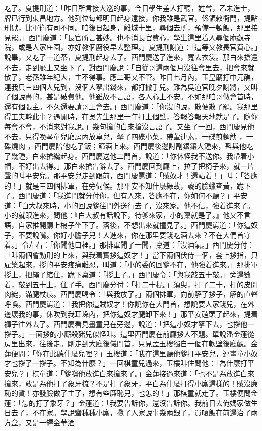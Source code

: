 吃了。夏提刑道：「昨日所言接大巡的事，今日學生差人打聽，姓曾，乙未進士，牌已行到東昌地方。他列位每都明日起身遠接，你我雖是武官，係領敕衙門，提點刑獄，比軍衛有司不同。咱後日起身，離城十里，尋個去所，預備一頓飯，那里接見罷。」西門慶道：「長官所言甚妙。也不消長官費心，學生這里着人尋個庵觀寺院，或是人家庄園，亦好教個廚役早去整理。」夏提刑謝道：「這等又教長官費心。」說畢，又吃了一道茶，夏提刑起身去了。西門慶送了進來，寬去衣裳。那白來搶還不去，走到廳上又坐下了，對西門慶說：「自從哥這兩個月沒往會里去，把會來就散了，老孫雖年紀大，主不得事。應二哥又不管。昨日七月內，玉皇廟打中元醮，連我只三四個人兒到，沒個人拏出錢來，都打撒手兒。難為吳道官晚夕謝將，又叫了個說書的，甚是破費他。他雖故不言語，各人心上不安。不如那咱哥做會首時，還有個張主。不久還要請哥上會去。」西門慶道：「你沒的說，散便散了罷。我那里得工夫幹此事？遇閒時，在吳先生那里一年打上個醮，答報答報天地就是了。隨你每會不會，不消來對我說。」幾句搶的白來搶沒言語了。又坐了一回，西門慶見他不去，只得喚琴童兒廂房內放卓兒，拏了四碟小菜，帶葷連素，一碟煎麵觔 ，一碟燒肉 ，西門慶陪他吃了飯；篩酒上來。西門慶後邊討副銀鑲大鍾來，斟與他吃了幾鍾，白來搶纔起身。西門慶送他二門首，說道：「你休怪我不送你。我帶着小帽，不好出去得。」那白來搶告辭去了。西門慶回到廳上，拉了把椅子來，就一片聲的叫平安兒。那平安兒走到跟前，西門慶罵道：「賊奴才！還站着！」叫：「答應的！」就是三四個排軍，在旁伺候。那平安不知什麼緣故，諕的臉蠟查黃，跪下了。西門慶道：「我進門就分付你，但有人來，答應不在，你如何不聽？」平安道：「白大叔來時，小的回說爹往門外送行去了，沒來家。他不信，強着進來了。小的就跟進來，問他：『白大叔有話說下，待爹來家，小的稟就是了。』他又不言語，自家推開廳上槅子坐下了。落後，不想出來就撞見了。」西門慶罵道：「你這奴子，不要說嘴。你好小膽子兒！人進來，你在那里耍錢吃酒去來？不在大們首守着。」令左右：「你聞他口裡。」那排軍聞了一聞，稟道：「沒酒氣。」西門慶分付：「叫兩個會動刑的上來，與我着實拶這奴才！」當下兩個伏侍一個，套上拶指，只雇檠起來，拶的平安疼痛難忍，叫道：「小的委的回爹不在，他強着進來。」那排軍拶上，把繩子綰住，跪下稟道：「拶上了。」西門慶令：「與我敲五十敲。」旁邊數着，敲到五十上，住了手。西門慶分付：「打二十棍。」須臾，打了二十，打的皮開肉綻，滿腿杖痕。西門慶喝令：「與我放了。」兩個排軍，向前解了拶子，解的直聲呼喚。西門慶罵道：「我把你這賊奴才！你說你在大門首，想說要人家錢兒，在外邊壞我的事，休吹到我耳垛內，把你這奴才腿卸下來！」那平安磕頭了起來，提着褲子往外去了。西門慶看見畫童兒在旁邊，說道：「把這小奴才拏下去，也拶他一拶子。」一面拶的小廝殺豬兒似怪叫。這里西門慶在前廳拶人不題。單說潘金蓮從房里出來，往後走。剛走到大廳後儀門首，只見孟玉樓獨自一個在軟壁後廳覷。金蓮便問：「你在此聽什麼兒哩？」玉樓道：「我在這里聽他爹打平安兒，連畫童小奴才也拶了一拶子。不知為什麼？」一回棋童兒過來，玉樓叫住問他：「為什麼打平安兒？」棋童道：「爹嗔他放進白來搶來了。」金蓮接過來道：「也不是為放進白來搶來，敢是為他打了象牙梳？不是打了象牙，平白為什麼打得小廝這樣的！賊沒廉恥的貨！亦發臉做了主了，想有些廉恥兒，也怎的！」那棋童就走了。玉樓便問金蓮：「怎的打了象牙？」金蓮道：「我要告訴你，還沒告訴你。我前日去俺媽家做生日去了，不在家。學說蠻秫秫小廝，攬了人家說事幾兩銀子，買嗄飯在前邊治了兩方盒，又是一罈金華酒 